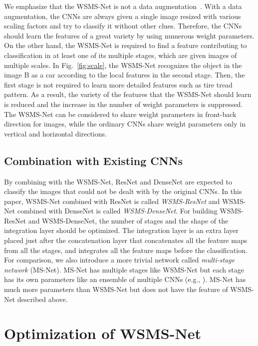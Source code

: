 \documentclass[journal]{IEEEtran}
\begin{document}
We emphasize that the WSMS-Net is not a data augmentation~\cite{Lee2014}. %
With a data augmentation, the CNNs are always given a single image resized with various scaling factors and try to classify it without other clues.
Therefore, the CNNs should learn the features of a great variety by using numerous weight parameters.
On the other hand, the WSMS-Net is required to find a feature contributing to classification in at least one of its multiple stages, which are given images of multiple scales.
In Fig.~\ref{fig:scale}, the WSMS-Net recognizes the object in the image B as a car according to the local features in the second stage.
Then, the first stage is not required to learn more detailed features such as tire tread pattern.
As a result, the variety of the features that the WSMS-Net should learn is reduced and the increase in the number of weight parameters is suppressed.
The WSMS-Net can be considered to share weight parameters in front-back direction for images, while the ordinary CNNs share weight parameters only in vertical and horizontal directions.


\subsection{Combination with Existing CNNs}
By combining with the WSMS-Net, ResNet and DenseNet are expected to classify the images that could not be dealt with by the original CNNs.
In this paper, WSMS-Net combined with ResNet is called \emph{WSMS-ResNet} and WSMS-Net combined with DenseNet is called \emph{WSMS-DenseNet}.
For building WSMS-ResNet and WSMS-DenseNet, the number of stages and the shape of the integration layer should be optimized.
The integration layer is an extra layer placed just after the concatenation layer that concatenates all the feature maps from all the stages, and integrates all the feature maps before the classification.
For comparison, we also introduce a more trivial network called \emph{multi-stage network} (MS-Net).
MS-Net has multiple stages like WSMS-Net but each stage has its own parameters like an ensemble of multiple CNNs (e.g., \cite{Zhang2016a}).
MS-Net has much more parameters than WSMS-Net but does not have the feature of WSMS-Net described above.


\section{Optimization of WSMS-Net}
\label{sec:Opt}
\end{document}
